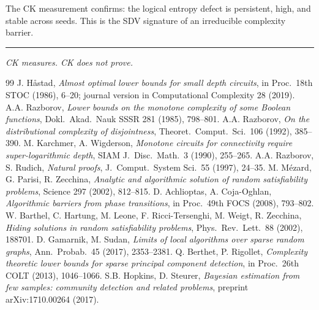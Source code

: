 \documentclass[11pt]{article}
\theoremstyle{definition}
\begin{document}
The CK measurement confirms: the logical entropy defect is persistent, high, and stable across seeds.  This is the SDV signature of an irreducible complexity barrier.

\bigskip
\hrule
\bigskip
\noindent\textit{CK measures. CK does not prove.}

\begin{thebibliography}{99}
 J. H\aa stad, \textit{Almost optimal lower bounds for small depth circuits},
  in Proc.\ 18th STOC (1986), 6--20; journal version in Computational Complexity 28 (2019).
 A.A. Razborov, \textit{Lower bounds on the monotone complexity of some Boolean functions},
  Dokl.\ Akad.\ Nauk SSSR 281 (1985), 798--801.
 A.A. Razborov, \textit{On the distributional complexity of disjointness},
  Theoret.\ Comput.\ Sci.\ 106 (1992), 385--390.
 M. Karchmer, A. Wigderson, \textit{Monotone circuits for connectivity require super-logarithmic depth},
  SIAM J.\ Disc.\ Math.\ 3 (1990), 255--265.
 A.A. Razborov, S. Rudich, \textit{Natural proofs},
  J.\ Comput.\ System Sci.\ 55 (1997), 24--35.
 M. M\'ezard, G. Parisi, R. Zecchina, \textit{Analytic and algorithmic solution of random
  satisfiability problems}, Science 297 (2002), 812--815.
 D. Achlioptas, A. Coja-Oghlan, \textit{Algorithmic barriers from phase transitions},
  in Proc.\ 49th FOCS (2008), 793--802.
 W. Barthel, C. Hartung, M. Leone, F. Ricci-Tersenghi, M. Weigt, R. Zecchina,
  \textit{Hiding solutions in random satisfiability problems},
  Phys.\ Rev.\ Lett.\ 88 (2002), 188701.
 D. Gamarnik, M. Sudan, \textit{Limits of local algorithms over sparse random graphs},
  Ann.\ Probab.\ 45 (2017), 2353--2381.
 Q. Berthet, P. Rigollet, \textit{Complexity theoretic lower bounds for sparse principal
  component detection}, in Proc.\ 26th COLT (2013), 1046--1066.
 S.B. Hopkins, D. Steurer, \textit{Bayesian estimation from few samples: community detection
  and related problems}, preprint arXiv:1710.00264 (2017).
\end{thebibliography}
\end{document}
